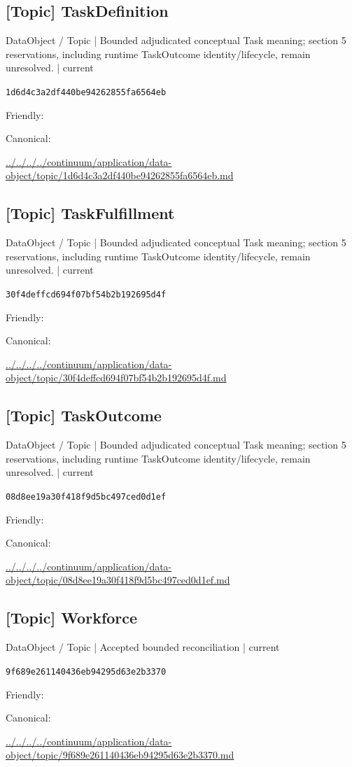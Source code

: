 \documentclass[10pt,a4paper]{article}
\begin{document}
\subsection*{[Topic] TaskDefinition}
{\small DataObject / Topic | Bounded adjudicated conceptual Task meaning; section 5 reservations, including runtime TaskOutcome identity/lifecycle, remain unresolved. | current}\par
\texttt{1d6d4c3a2df440be94262855fa6564eb}\par
Friendly: \par
Canonical: \par
{\footnotesize\url{../../../../continuum/application/data-object/topic/1d6d4c3a2df440be94262855fa6564eb.md}}\par
\subsection*{[Topic] TaskFulfillment}
{\small DataObject / Topic | Bounded adjudicated conceptual Task meaning; section 5 reservations, including runtime TaskOutcome identity/lifecycle, remain unresolved. | current}\par
\texttt{30f4deffcd694f07bf54b2b192695d4f}\par
Friendly: \par
Canonical: \par
{\footnotesize\url{../../../../continuum/application/data-object/topic/30f4deffcd694f07bf54b2b192695d4f.md}}\par
\subsection*{[Topic] TaskOutcome}
{\small DataObject / Topic | Bounded adjudicated conceptual Task meaning; section 5 reservations, including runtime TaskOutcome identity/lifecycle, remain unresolved. | current}\par
\texttt{08d8ee19a30f418f9d5bc497ced0d1ef}\par
Friendly: \par
Canonical: \par
{\footnotesize\url{../../../../continuum/application/data-object/topic/08d8ee19a30f418f9d5bc497ced0d1ef.md}}\par
\subsection*{[Topic] Workforce}
{\small DataObject / Topic | Accepted bounded reconciliation | current}\par
\texttt{9f689e261140436eb94295d63e2b3370}\par
Friendly: \par
Canonical: \par
{\footnotesize\url{../../../../continuum/application/data-object/topic/9f689e261140436eb94295d63e2b3370.md}}\par
\end{document}
